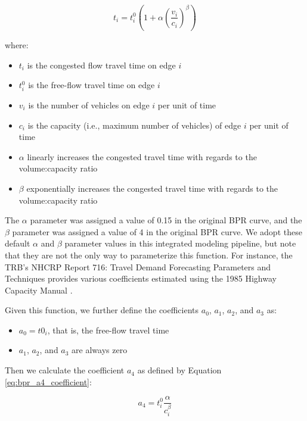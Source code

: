 \begin{equation}
    t_i = t^0_i (1 + \alpha (\frac{v_i}{c_i}) ^ \beta)
    \label{eq:bpr_function}
\end{equation}

where:

\begin{itemize}
    \item $t_i$ is the congested flow travel time on edge $i$
    \item $t^0_i$ is the free-flow travel time on edge $i$
    \item $v_i$ is the number of vehicles on edge $i$ per unit of time 
    \item $c_i$ is the capacity (i.e., maximum number of vehicles) of edge $i$ per unit of time
    \item $\alpha$ linearly increases the congested travel time with regards to the volume:capacity ratio
    \item $\beta$ exponentially increases the congested travel time with regards to the volume:capacity ratio
\end{itemize}

The $\alpha$ parameter was assigned a value of 0.15 in the original BPR curve, and the $\beta$ parameter was assigned a value of 4 in the original BPR curve. We adopt these default $\alpha$ and $\beta$ parameter values in this integrated modeling pipeline, but note that they are not the only way to parameterize this function. For instance, the TRB's NHCRP Report 716: Travel Demand Forecasting Parameters and Techniques provides various coefficients estimated using the 1985 Highway Capacity Manual \citep[p.~75]{transportation_research_board_highway_1985,transportation_research_board_travel_2012}.

Given this function, we further define the coefficients $a_0$, $a_1$, $a_2$, and $a_3$ as:
 
\begin{itemize}
    \item $a_0 = t0_i$, that is, the free-flow travel time
    \item $a_1$, $a_2$, and $a_3$ are always zero
\end{itemize}

Then we calculate the coefficient $a_4$ as defined by Equation \ref{eq:bpr_a4_coefficient}:

\begin{equation}
    a_4 = t^0_i \frac{\alpha}{c_i ^ {\beta}}
    \label{eq:bpr_a4_coefficient}
\end{equation}

